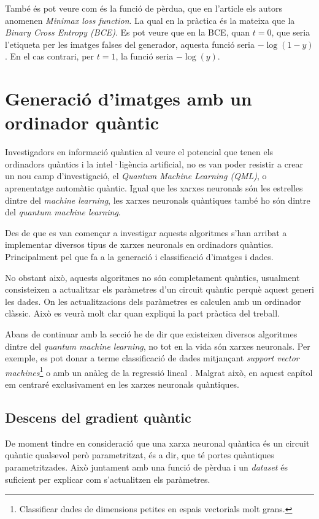 També és pot veure com és la funció de pèrdua, que en l'article els autors anomenen \textit{Minimax loss function}. La qual en la pràctica és la mateixa que la \textit{Binary Cross Entropy (BCE)}. Es pot veure que en la BCE, quan $t=0$, que seria l'etiqueta per les imatges falses del generador, aquesta funció seria $- \log(1-y)$. En el cas contrari, per $t=1$, la funció seria $ - \log(y)$.



\chapter{Generació d'imatges amb un ordinador quàntic}

Investigadors en informació quàntica al veure el potencial que tenen els ordinadors quàntics i la intel·ligència artificial, no es van poder resistir a crear un nou camp d'investigació, el \textit{Quantum Machine Learning (QML)}, o aprenentatge automàtic quàntic. Igual que les xarxes neuronals són les estrelles dintre del \textit{machine learning}, les xarxes neuronals quàntiques també ho són dintre del \textit{quantum machine learning}.

Des de que es van començar a investigar aquests algoritmes s'han arribat a implementar diversos tipus de xarxes neuronals en ordinadors quàntics. Principalment pel que fa a la generació i classificació d'imatges i dades.

No obstant això, aquests algoritmes no són completament quàntics, usualment consisteixen a actualitzar els paràmetres d'un circuit quàntic perquè aquest generi les dades. On les actualitzacions dels paràmetres es calculen amb un ordinador clàssic. Això es veurà molt clar quan expliqui la part pràctica del treball.

Abans de continuar amb la secció he de dir que existeixen diversos algoritmes dintre del \textit{quantum machine learning}, no tot en la vida són xarxes neuronals. Per exemple, es pot donar a terme classificació de dades mitjançant \textit{support vector machines}\footnote{Classificar dades de dimensions petites en espais vectorials molt grans.} \cite{QSVM_2019, QSVM_xanadu_2019} o amb un anàleg de la regressió lineal \cite{Q_linear_regression_xanadu}. Malgrat això, en aquest capítol em centraré exclusivament en les xarxes neuronals quàntiques.

\section{Descens del gradient quàntic}
De moment tindre en consideració que una xarxa neuronal quàntica és un circuit quàntic qualsevol però parametritzat, és a dir, que té portes quàntiques parametritzades. Això juntament amb una funció de pèrdua i un \textit{dataset} és suficient per explicar com s'actualitzen els paràmetres.

